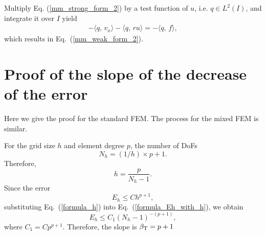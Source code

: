\documentclass[review,3p]{elsarticle}
\begin{document}
Multiply Eq. (\ref{mm_strong_form_2}) by a test function of $u$, i.e. $q \in L^2 (I)$, and integrate it over $I$ yield
\begin{align}
- \langle q , \, v_x \rangle - \langle q, \, ru \rangle = - \langle q, \, f \rangle,
\end{align}
which results in Eq.~(\ref{mm_weak_form_2}).

\section{Proof of the slope of the decrease of the error}				\label{proof_slope_ET}

Here we give the proof for the standard FEM. The process for the mixed FEM is similar. 

For the grid size $h$ and element degree $p$, the number of DoFs
\begin{equation}
N_h=(1/h) \times p+1.			\label{formula_Nh}
\end{equation}
Therefore,
\begin{equation}
h=\frac{p}{N_h-1}.		\label{formula_h}
\end{equation}
Since the error \cite{gockenbach2006understanding}
\begin{equation}
E_h \leqslant Ch^{p+1},			\label{formula_Eh_with_h}
\end{equation}
substituting Eq.~(\ref{formula_h}) into Eq.~(\ref{formula_Eh_with_h}), we obtain
\begin{equation}
E_h \leqslant C_1(N_h-1)^{-(p+1)},			\label{formula_Eh_with_Nh}
\end{equation}
where $C_1=C p^{p+1}$. Therefore, the slope is $\beta_{\rm T}=p+1$

  

\end{document}
